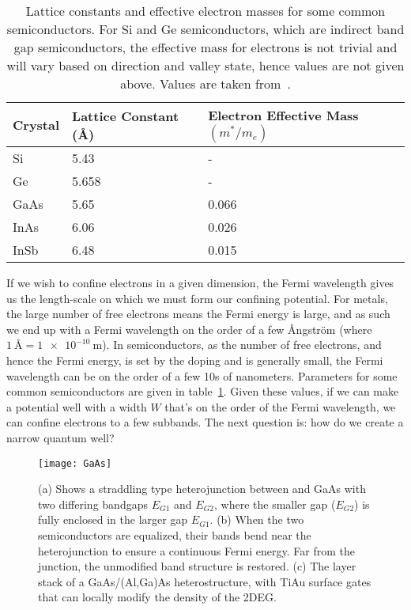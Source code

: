 \begin{table}
  \centering
  \begin{tabular}{|l|l|l|}
   \hline
   Crystal & Lattice Constant (\si{\angstrom}) & Electron Effective Mass$(m^*/m_e)$ \\
   \hline
   Si & 5.43 & - \\
   Ge & 5.658 & - \\
   GaAs & 5.65 & 0.066 \\
   InAs & 6.06 & 0.026 \\
   InSb & 6.48 & 0.015 \\
   \hline
  \end{tabular}
  \caption[Properties of some common Semiconductors]
  {Lattice constants and effective electron masses for some common semiconductors. For Si and Ge semiconductors, which are
  indirect band gap semiconductors, the effective mass for electrons is not trivial and will vary based
  on direction and valley state, hence values are not given above. Values are taken from~\cite{Kittel2004,InSbParam}.}
  \label{tab:semiprop}
\end{table}

If we wish to confine electrons in a given dimension, the Fermi wavelength gives us the length-scale on which we must form
our confining potential. For metals, the large number of free electrons means the Fermi energy is large, and as such we end up with a
Fermi wavelength on the order of a few Ångström (where $\SI{1}{\angstrom} = \SI{1e-10}{\meter}$). In semiconductors, as
the number of free electrons, and hence the Fermi energy, is set by the doping and is generally small, the Fermi
wavelength can be on the order of a few 10s of nanometers. Parameters for some common semiconductors are given
in table~\ref{tab:semiprop}. Given these values, if we can make a potential well with a width $W$ that's on
the order of the Fermi wavelength, we can confine electrons to a few subbands. The next question is: how
do we create a narrow quantum well?

\begin{figure}
  \texttt{[image: GaAs]}
  \caption[Band bending in a straddling type heterojunction, and the GaAs/AlGaAs heterostructure]
  {\label{fig:heterostructure}(a) Shows a straddling type heterojunction between  and GaAs with two
  differing bandgaps $E_{G1}$ and $E_{G2}$, where the smaller gap ($E_{G2}$) is fully enclosed in the larger gap $E_{G1}$.
  (b) When the two semiconductors are equalized, their bands bend near the heterojunction to ensure a continuous Fermi energy.
  Far from the junction, the unmodified band structure is restored. (c) The layer stack of a GaAs/(Al,Ga)As heterostructure,
  with TiAu surface gates that can locally modify the density of the 2DEG.}
\end{figure}

